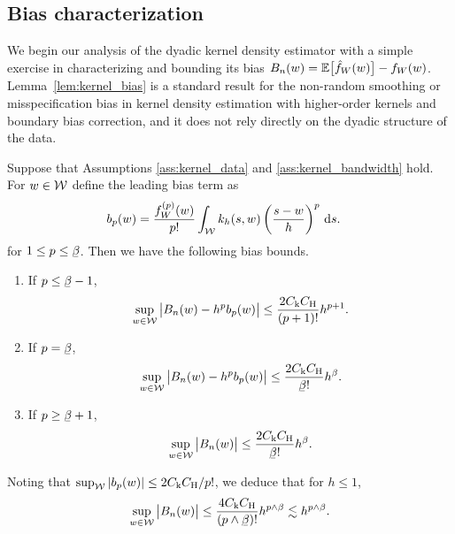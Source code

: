 \subsection{Bias characterization}
\label{sec:kernel_bias}

We begin our analysis of the dyadic kernel density estimator with a simple
exercise in characterizing and bounding its bias
$B_n(w) = \mathbb{E} \big[ \hat f_W(w) \big] - f_W(w)$.
Lemma~\ref{lem:kernel_bias} is a standard result for the non-random
smoothing or misspecification bias
in kernel density estimation with higher-order kernels
and boundary bias correction, and it
does not rely directly on the dyadic structure of the data.

\begin{lemma}
  \label{lem:kernel_bias}

  Suppose that Assumptions \ref{ass:kernel_data} and
  \ref{ass:kernel_bandwidth} hold.
  For $w \in \mathcal{W}$
  define the leading bias term as
  \begin{align*}
    b_p(w)
    &=
    \frac{f_W^{(p)}(w)}{p!}
    \int_{\mathcal{W}}
    k_h(s,w)
    \left(
      \frac{s-w}{h}
    \right)^p
    \,\mathrm{d}s.
  \end{align*}
  for $1 \leq p \leq \flbeta$.
  Then we have the following bias bounds.
  \begin{enumerate}[label=(\roman*)]

    \item If $p \leq \flbeta - 1$,
      \begin{align*}
        \sup_{w \in \mathcal{W}}
        \big|
        B_n(w)
        - h^p b_p(w)
        \big|
        \leq
        \frac{2 C_{\mathrm{k}} C_{\mathrm{H}}}{(p+1)!}
        h^{p+1}.
      \end{align*}

    \item If $p = \flbeta$,
      \begin{align*}
        \sup_{w \in \cW}
        \big|
        B_n(w)
        - h^p b_p(w)
        \big|
        \leq
        \frac{2 C_\rk C_\rH}{\flbeta !}
        h^\beta.
      \end{align*}

    \item If $p \geq \flbeta+1$,
      \begin{align*}
        \sup_{w \in \cW}
        \big|
        B_n(w)
        \big|
        \leq
        \frac{2 C_\rk C_\rH}{\flbeta !}
        h^\beta.
      \end{align*}

  \end{enumerate}
  Noting that
  $\sup_{\mathcal{W}} |b_p(w)| \leq 2 C_{\mathrm{k}} C_{\mathrm{H}} / p!$,
  we deduce that for $h \leq 1$,
  \begin{align*}
    \sup_{w \in \cW}
    \big|
    B_n(w)
    \big|
    \leq
    \frac{4 C_\rk C_\rH}{(p \wedge \flbeta)!}
    h^{p \wedge \beta}
    \lesssim
    h^{p \wedge \beta}.
  \end{align*}

\end{lemma}

